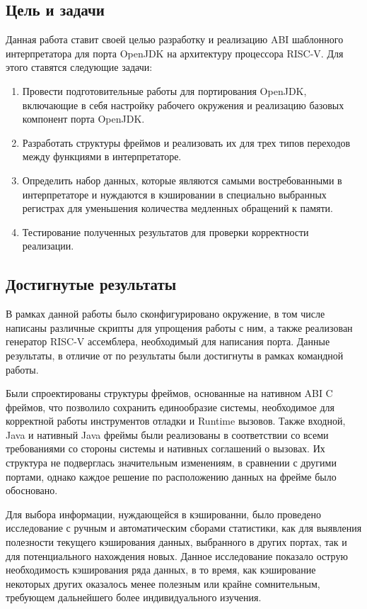 \subsection*{Цель и задачи}

Данная работа ставит своей целью разработку и реализацию ABI шаблонного интерпретатора для порта OpenJDK на архитектуру процессора RISC-V. Для этого ставятся следующие задачи:

\begin{enumerate}
    \item Провести подготовительные работы для портирования OpenJDK, включающие в себя настройку рабочего окружения и реализацию базовых компонент порта OpenJDK.
    \item Разработать структуры фреймов и реализовать их для трех типов переходов между функциями в интерпретаторе.
    \item Определить набор данных, которые являются самыми востребованными в интерпретаторе и нуждаются в кэшировании в специально выбранных регистрах для уменьшения количества медленных обращений к памяти.
    \item Тестирование полученных результатов для проверки корректности реализации.
\end{enumerate}




\subsection*{Достигнутые результаты}

В рамках данной работы было сконфигурировано окружение, в том числе написаны различные скрипты для упрощения работы с ним, а также реализован генератор RISC-V ассемблера, необходимый для написания порта. Данные результаты, в отличие от по результаты были достигнуты в рамках командной работы.

Были спроектированы структуры фреймов, основанные на нативном ABI C фреймов, что позволило сохранить единообразие системы, необходимое для корректной работы инструментов отладки и Runtime вызовов. Также входной, Java и нативный Java фреймы были реализованы в соответствии со всеми требованиями со стороны системы и нативных соглашений о вызовах. Их структура не подверглась значительным изменениям, в сравнении с другими портами, однако каждое решение по расположению данных на фрейме было обосновано.

Для выбора информации, нуждающейся в кэшированни, было проведено исследование с ручным и автоматическим сборами статистики, как для выявления полезности текущего кэширования данных, выбранного в других портах, так и для потенциального нахождения новых. Данное исследование показало острую необходимость кэширования ряда данных, в то время, как кэширование некоторых других оказалось менее полезным или крайне сомнительным, требующем дальнейшего более индивидуального изучения.

